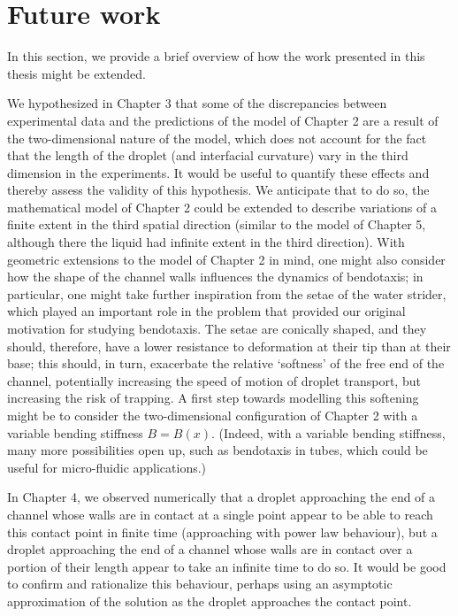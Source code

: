 \section{Future work}
In this section, we provide a brief overview of how the work presented in this thesis might be extended.

We hypothesized in Chapter 3 that some of the discrepancies between experimental data and the predictions of the model of Chapter 2 are a result of  the two-dimensional nature of the model, which does not account for the fact that the length of the droplet (and interfacial curvature) vary in the third dimension in the experiments. It would be useful to quantify these effects and thereby assess the validity of this hypothesis. We anticipate that to do so, the mathematical model of Chapter 2 could be extended to describe variations of a finite extent in the third spatial direction (similar to the model of Chapter 5, although there the liquid had infinite extent in the third direction). With geometric extensions to the model of Chapter 2 in mind, one might also consider how the shape of the channel walls influences the dynamics of bendotaxis; in particular, one might take further inspiration from the setae of the water strider, which played an important role in the problem that provided our original motivation for studying bendotaxis. The setae are conically shaped, and they should, therefore, have a lower resistance to deformation at their tip than at their base; this should, in turn, exacerbate the relative `softness' of the free end of the channel, potentially increasing the speed of motion of droplet transport, but increasing the risk of trapping. A first step towards modelling this softening might be to consider the two-dimensional configuration of Chapter 2 with a variable bending stiffness $B = B(x)$. (Indeed, with a variable bending stiffness, many more possibilities open up, such as bendotaxis in tubes, which could be useful for micro-fluidic applications.)

In Chapter 4, we observed numerically that a droplet approaching the end of a channel whose walls are in contact at a single point appear to be able to reach this contact point in finite time (approaching with power law behaviour), but a droplet approaching the end of a channel whose walls are in contact over a portion of their length appear to take an infinite time to do so. It would be good to confirm and rationalize this behaviour, perhaps using an asymptotic approximation of the solution as the droplet approaches the contact point.

